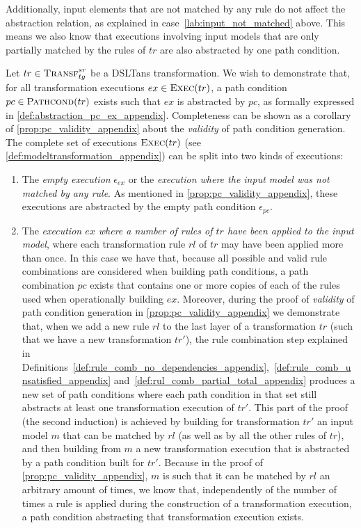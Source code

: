 \begin{pf}
\begin{enumerate}
Additionally, input elements that are not matched by any rule do not affect the abstraction relation, as explained in case~\ref{lab:input_not_matched} above. This means we also know that executions involving input models that are only partially matched by the rules of $tr$ are also abstracted by one path condition. 
\end{enumerate}

Let $tr\in \textsc{Transf}^{sr}_{tg}$ be a DSLTans transformation. We wish to demonstrate that, for all transformation executions $ex\in \textsc{Exec}(tr)$, a path condition $pc\in \textsc{Pathcond}(tr)$ exists such that $ex$ is abstracted by $pc$, as formally expressed in \cref{def:abstraction_pc_ex_appendix}.
Completeness can be shown as a corollary of \cref{prop:pc_validity_appendix} about the \emph{validity} of path condition generation. The complete set of executions $\textsc{Exec}(tr)$ (see \cref{def:modeltransformation_appendix}) can be split into two kinds of executions:
\begin{enumerate}
  \item\label{lab:input_not_matched} The \emph{empty execution} $\epsilon_{ex}$ or the \emph{execution where the input model was not matched by any rule}. As mentioned in \cref{prop:pc_validity_appendix}, these executions are abstracted by the empty path condition $\epsilon_{pc}$.\vspace{.3cm}
  \item The \emph{execution $ex$ where a number of rules of $tr$ have been applied to the input model}, where each transformation rule $rl$ of $tr$ may have been applied more than once. In this case we have that, because all possible and valid rule combinations are considered when building path conditions, a path combination $pc$ exists that contains one or more copies of each of the rules used when operationally building $ex$. 
Moreover, during the proof of \emph{validity} of path condition generation in \cref{prop:pc_validity_appendix} we demonstrate that, when we add a new rule $rl$ to the last layer of a transformation $tr$ (such that we have a new transformation $tr'$), the rule combination step explained in Definitions~\ref{def:rule_comb_no_dependencies_appendix},~\ref{def:rule_comb_unsatisfied_appendix} and~\ref{def:rul_comb_partial_total_appendix} produces a new set of path conditions where each path condition in that set still abstracts at least one transformation execution of $tr'$. This part of the proof (the second induction) is achieved by building for transformation $tr'$ an input model $m$ that can be matched by $rl$ (as well as by all the other rules of $tr$), and then building from $m$ a new transformation execution that is abstracted by a path condition built for $tr'$. Because in the proof of \cref{prop:pc_validity_appendix}, $m$ is such that it can be matched by $rl$ an arbitrary amount of times, we know that, independently of the number of times a rule is applied during the construction of a transformation execution, a path condition abstracting that transformation execution exists.\\


\end{enumerate}
\end{pf}
